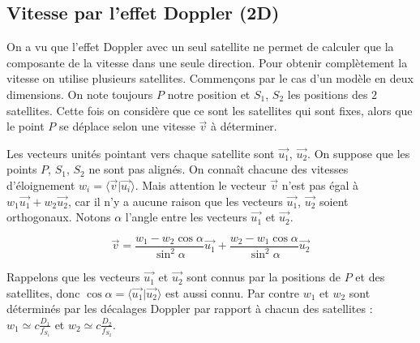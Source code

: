 \documentclass[class=report,crop=false]{standalone}
\newcommand{\vect}{\overrightarrow}
\begin{document}
\subsection{Vitesse par l'effet Doppler (2D)}

On a vu que l'effet Doppler avec un seul satellite 
ne permet de calculer que la composante 
de la vitesse dans une seule direction. Pour obtenir complètement 
la vitesse on utilise plusieurs satellites.
Commençons par le cas d'un modèle en deux dimensions.
On note toujours $P$ notre position et $S_1$, $S_2$ les positions 
des $2$ satellites. Cette fois 
on considère que ce sont les satellites qui sont fixes, alors
que le point $P$ se déplace selon une vitesse $\vect v$ à déterminer.

Les vecteurs unités pointant vers chaque satellite sont $\vect{u_1}$, $\vect{u_2}$.
On suppose que les points $P$, $S_1$, $S_2$ ne sont pas alignés.
On connaît chacune des vitesses d'éloignement 
$w_i = \langle \vect v | \vect{u_i} \rangle$.
Mais attention le vecteur $\vect v$ n'est pas égal à $w_1 \vect{u_1} + w_2 \vect{u_2}$,
car il n'y a aucune raison que les vecteurs $\vect{u_1}$, $\vect{u_2}$ soient orthogonaux.
Notons $\alpha$ l'angle entre les vecteurs $\vect{u_1}$ et $\vect{u_2}$.
\begin{proposition}
$$\vect v = \frac{w_1 - w_2 \cos\alpha}{\sin^2\alpha} \vect{u_1} + 
 \frac{w_2 -w_1 \cos \alpha}{\sin^2\alpha} \vect{u_2}$$  
\end{proposition}


Rappelons que les vecteurs $\vect{u_1}$ et $\vect{u_2}$ sont connus par la positions
de $P$ et des satellites, donc $\cos\alpha = \langle \vect{u_1} | \vect{u_2} \rangle$ est aussi connu.
Par contre $w_1$ et $w_2$ sont déterminés par les décalages Doppler par rapport à chacun des satellites :
$w_1 \simeq c \frac{D_1}{f_{S_1}}$ et 
$w_2 \simeq c \frac{D_2}{f_{S_2}}$.
\end{document}

